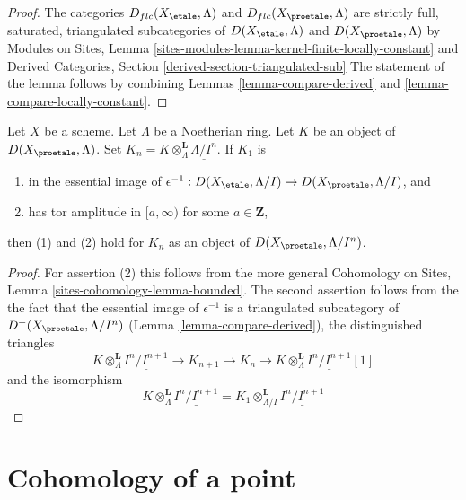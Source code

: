 \begin{proof}
The categories $D_{flc}(X_\etale, \Lambda)$ and $D_{flc}(X_\proetale, \Lambda)$
are strictly full, saturated, triangulated subcategories of
$D(X_\etale, \Lambda)$ and $D(X_\proetale, \Lambda)$
by Modules on Sites, Lemma
\ref{sites-modules-lemma-kernel-finite-locally-constant}
and
Derived Categories, Section \ref{derived-section-triangulated-sub}
The statement of the lemma follows by combining
Lemmas \ref{lemma-compare-derived} and
\ref{lemma-compare-locally-constant}.
\end{proof}

\begin{lemma}
\label{lemma-compare-truncations}
Let $X$ be a scheme. Let $\Lambda$ be a Noetherian ring.
Let $K$ be an object of $D(X_\proetale, \Lambda)$.
Set $K_n = K \otimes_\Lambda^\mathbf{L} \underline{\Lambda/I^n}$.
If $K_1$ is
\begin{enumerate}
\item in the essential image of
$\epsilon^{-1} :D(X_\etale, \Lambda/I) \to D(X_\proetale, \Lambda/I)$, and
\item has tor amplitude in $[a,\infty)$ for some $a \in \mathbf{Z}$,
\end{enumerate}
then (1) and (2) hold for $K_n$ as an object of $D(X_\proetale, \Lambda/I^n)$.
\end{lemma}

\begin{proof}
For assertion (2) this follows from the more general
Cohomology on Sites, Lemma \ref{sites-cohomology-lemma-bounded}.
The second assertion follows from the the fact that
the essential image of $\epsilon^{-1}$ is a triangulated
subcategory of $D^+(X_\proetale, \Lambda/I^n)$
(Lemma \ref{lemma-compare-derived}),
the distinguished triangles
$$
K \otimes_\Lambda^\mathbf{L} \underline{I^n/I^{n + 1}} \to
K_{n + 1} \to
K_n \to
K \otimes_\Lambda^\mathbf{L} \underline{I^n/I^{n + 1}}[1]
$$
and the isomorphism
$$
K \otimes_\Lambda^\mathbf{L} \underline{I^n/I^{n + 1}} =
K_1 \otimes_{\Lambda/I}^\mathbf{L} \underline{I^n/I^{n + 1}}
$$
\end{proof}






\section{Cohomology of a point}
\label{section-cohomology-point}

